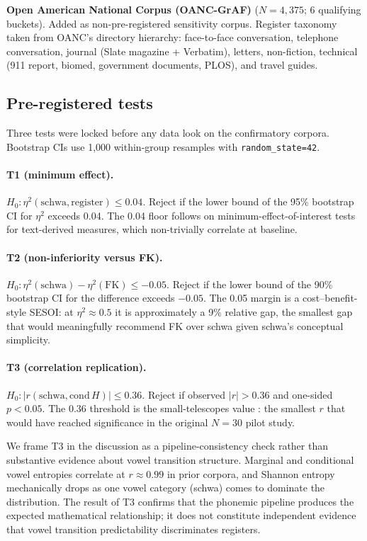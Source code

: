 \documentclass[11pt,a4paper]{article}
\begin{document}
\textbf{Open American National Corpus (OANC-GrAF)}
\citep{ide2007anc} (\(N{=}4{,}375\); 6 qualifying buckets). Added as
non-pre-registered sensitivity corpus. Register taxonomy taken from
OANC's directory hierarchy: face-to-face conversation, telephone
conversation, journal (Slate magazine + Verbatim), letters,
non-fiction, technical (911 report, biomed, government documents,
PLOS), and travel guides.

\subsection{Pre-registered tests}

Three tests were locked before any data look on the confirmatory
corpora. Bootstrap CIs use 1{,}000 within-group resamples with
\texttt{random\_state=42}.

\paragraph{T1 (minimum effect).} \(H_0\colon \eta^2(\text{schwa},
\text{register}) \le 0.04\). Reject if the lower bound of the 95\%
bootstrap CI for \(\eta^2\) exceeds 0.04. The 0.04 floor follows
\citet{lakens2022} on minimum-effect-of-interest tests for
text-derived measures, which non-trivially correlate at baseline.

\paragraph{T2 (non-inferiority versus FK).} \(H_0\colon
\eta^2(\text{schwa}) - \eta^2(\text{FK}) \le -0.05\). Reject if the
lower bound of the 90\% bootstrap CI for the difference exceeds
\(-0.05\). The 0.05 margin is a cost--benefit-style SESOI: at
\(\eta^2 \approx 0.5\) it is approximately a 9\% relative gap, the
smallest gap that would meaningfully recommend FK over schwa given
schwa's conceptual simplicity.

\paragraph{T3 (correlation replication).} \(H_0\colon \lvert r(\text{schwa},
\text{cond}\,H) \rvert \le 0.36\). Reject if observed
\(\lvert r \rvert > 0.36\) and one-sided \(p < 0.05\). The 0.36
threshold is the small-telescopes value \citep{simonsohn2015}: the
smallest \(r\) that would have reached significance in the original
\(N{=}30\) pilot study.

We frame T3 in the discussion as a pipeline-consistency check rather
than substantive evidence about vowel transition structure. Marginal
and conditional vowel entropies correlate at \(r \approx 0.99\) in
prior corpora, and Shannon entropy mechanically drops as one vowel
category (schwa) comes to dominate the distribution. The result of
T3 confirms that the phonemic pipeline produces the expected
mathematical relationship; it does not constitute independent evidence
that vowel transition predictability discriminates registers.
\end{document}
